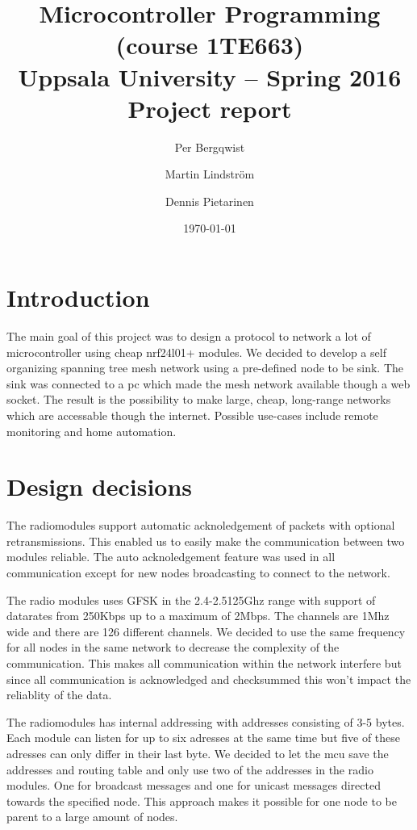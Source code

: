 \documentclass[a4paper,11pt]{article}
\title{\textbf{Microcontroller Programming (course 1TE663) \\
    Uppsala University -- Spring 2016 \\
    Project report}}
\author{Per Bergqwist \and Martin Lindström \and Dennis Pietarinen}
\date{\today}
\begin{document}
\maketitle

\tableofcontents

\section{Introduction}
The main goal of this project was to design a protocol to
network a lot of microcontroller using cheap nrf24l01+ modules.  We
decided to develop a self organizing spanning tree mesh network using
a pre-defined node to be sink.  The sink was connected to a pc which
made the mesh network available though a web socket.  The result is
the possibility to make large, cheap, long-range networks which are
accessable though the internet.  Possible use-cases include remote
monitoring and home automation.

\section{Design decisions}
The radiomodules support automatic acknoledgement of packets with
optional retransmissions\cite{nrfDS}. This enabled us to easily make the
communication between two modules reliable. The auto acknoledgement
feature was used in all communication except for new nodes
broadcasting to connect to the network.

The radio modules uses GFSK in the 2.4-2.5125Ghz range with support of
datarates from 250Kbps up to a maximum of 2Mbps. The channels are 1Mhz
wide and there are 126 different channels\cite{nrfDS}. We decided to use the same
frequency for all nodes in the same network to decrease the complexity
of the communication. This makes all communication within the network
interfere but since all communication is acknowledged and checksummed
this won't impact the reliablity of the data.

The radiomodules has internal addressing with addresses consisting of
3-5 bytes. Each module can listen for up to six adresses at the same
time but five of these adresses can only differ in their last
byte\cite{nrfDS}. We decided to let the mcu save the addresses and
routing table and only use two of the addresses in the radio
modules. One for broadcast messages and one for unicast messages
directed towards the specified node. This approach makes it possible
for one node to be parent to a large amount of nodes.
\end{document}
